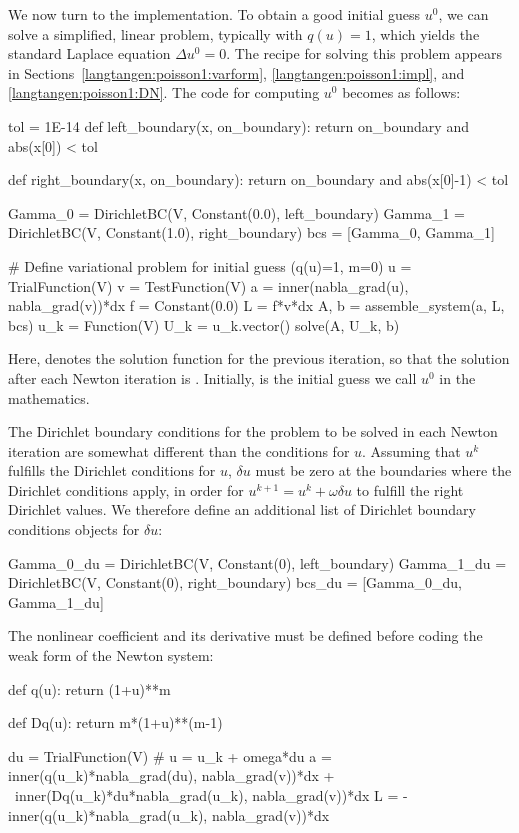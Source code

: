 We now turn to the implementation.  To obtain a good
initial guess $u^0$, we can solve a simplified, linear
problem, typically with $q(u)=1$, which yields the standard
Laplace equation $\Delta u^0 =0$. The recipe for solving this
problem appears in Sections~\ref{langtangen:poisson1:varform},
\ref{langtangen:poisson1:impl}, and \ref{langtangen:poisson1:DN}.
The code for computing $u^0$ becomes as follows:
\begin{python}
tol = 1E-14
def left_boundary(x, on_boundary):
    return on_boundary and abs(x[0]) < tol

def right_boundary(x, on_boundary):
    return on_boundary and abs(x[0]-1) < tol

Gamma_0 = DirichletBC(V, Constant(0.0), left_boundary)
Gamma_1 = DirichletBC(V, Constant(1.0), right_boundary)
bcs = [Gamma_0, Gamma_1]

# Define variational problem for initial guess (q(u)=1, m=0)
u = TrialFunction(V)
v = TestFunction(V)
a = inner(nabla_grad(u), nabla_grad(v))*dx
f = Constant(0.0)
L = f*v*dx
A, b = assemble_system(a, L, bcs)
u_k = Function(V)
U_k = u_k.vector()
solve(A, U_k, b)
\end{python}
Here,  denotes the solution function for the previous
iteration, so that the solution
after each Newton iteration is .
Initially,  is the initial guess we call $u^0$ in the mathematics.

The Dirichlet boundary conditions for the problem to be solved in each Newton
iteration are somewhat different than the conditions for $u$.
Assuming that $u^k$ fulfills the
Dirichlet conditions for $u$, $\delta u$ must be zero at the boundaries
where the Dirichlet conditions apply, in order for $u^{k+1}=u^k + \omega\delta u$ to fulfill
the right Dirichlet values. We therefore define an additional list of
Dirichlet boundary conditions objects for $\delta u$:
\begin{python}
Gamma_0_du = DirichletBC(V, Constant(0), left_boundary)
Gamma_1_du = DirichletBC(V, Constant(0), right_boundary)
bcs_du = [Gamma_0_du, Gamma_1_du]
\end{python}
The nonlinear coefficient and its derivative must be defined
before coding the weak form of the Newton system:
\begin{python}
def q(u):
    return (1+u)**m

def Dq(u):
    return m*(1+u)**(m-1)

du = TrialFunction(V) # u = u_k + omega*du
a = inner(q(u_k)*nabla_grad(du), nabla_grad(v))*dx + \
    inner(Dq(u_k)*du*nabla_grad(u_k), nabla_grad(v))*dx
L = -inner(q(u_k)*nabla_grad(u_k), nabla_grad(v))*dx
\end{python}

